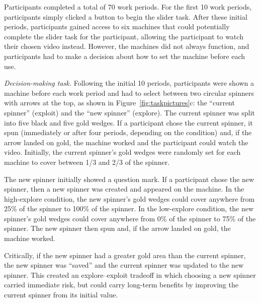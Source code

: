 \documentclass[10pt,letterpaper]{article}
\begin{document}
Participants completed a total of 70 work
periods. For the first 10 work periods, participants simply clicked a button to begin the
slider task. After these initial periods, participants gained access to six
machines that could potentially complete the slider task for the participant,
allowing the participant to watch their chosen video instead. However, the
machines did not always function, and participants had to make a decision about
how to set the machine before each use.

\emph{Decision-making task.}
Following the initial 10 periods, participants were shown a machine before each work period and had to select
between two circular spinners with arrows at the top, as shown in Figure~\ref{fig:taskpictures}c: the ``current spinner''
(exploit) and the ``new spinner'' (explore).
The current spinner was split into
five black and five gold wedges. If a participant chose the
current spinner, it spun (immediately or after four periods, depending
on the condition) and, if the arrow landed on gold, the machine
worked and the participant could watch the video. Initially, the
current spinner's gold wedges were randomly set for each machine to cover between
1/3 and 2/3 of the spinner.

The new spinner initially showed a question mark. If a participant chose the
new spinner, then a new spinner was
created and appeared on the machine. In the high-explore condition, the new spinner's gold wedges could cover
anywhere from 25\% of the spinner to 100\% of the spinner. In the low-explore condition, the new spinner's gold wedges could cover
anywhere from 0\% of the spinner to 75\% of the spinner. The new spinner then
spun and, if the arrow landed on gold, the machine worked.

Critically, if the new spinner had a greater gold area than the current
spinner, the new spinner was ``saved'' and the current spinner was
updated to the new spinner.  This created an explore--exploit tradeoff in which 
choosing a new spinner carried immediate risk, but could carry long-term
benefits by improving the current spinner from its initial value.
\end{document}
